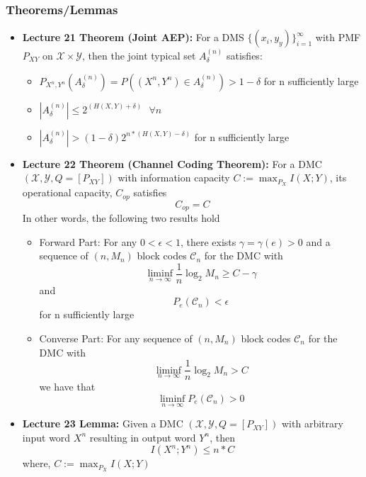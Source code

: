 \documentclass{article}
\begin{document}
\subsubsection{Theorems/Lemmas}
\begin{itemize}
    \item \textbf{Lecture 21 Theorem (Joint AEP):}
    For a DMS \(\{(x_i, y_y)\}_{i=1}^\infty\) with PMF \(P_{XY}\) on \(\mathcal{X} \times \mathcal{Y}\), then the joint typical set \(A^{(n)}_\delta\) satisfies:
    \begin{itemize}
        \item \(P_{X^n,Y^n} (A^{(n)}_\delta) = P((X^n, Y^n) \in A^{(n)}_\delta)> 1 - \delta\) for n sufficiently large
        \item \(|A^{(n)}_\delta| \leq 2^{(H(X,Y) + \delta)} \ \ \ \forall n\)
        \item \(|A^{(n)}_\delta| > (1-\delta) 2^{n*(H(X,Y) - \delta)}\) for n sufficiently large
    \end{itemize}
    \item \textbf{Lecture 22 Theorem (Channel Coding Theorem): }
    For a DMC \((\mathcal{X}, \mathcal{Y}, Q = [P_{XY}])\) with information capacity \(C:= \max_{P_X} I(X;Y)\), its operational capacity, \(C_{op}\) satisfies
    \[C_{op} = C\]
    In other words, the following two results hold
    \begin{itemize}
        \item Forward Part: For any \(0< \epsilon<1\), there exists \(\gamma = \gamma(e)>0\) and a sequence of \((n,M_n)\) block codes \(\mathcal{C}_n\) for the DMC with
        \[\liminf_{n \to \infty} \frac{1}{n} \log_2 M_n \geq C - \gamma\]
        and
        \[P_e(\mathcal{C}_n)< \epsilon\]
        for n sufficiently large
        \item Converse Part: For any sequence of \((n, M_n)\) block codes \(\mathcal{C}_n\) for the DMC with
        \[\liminf_{n \to \infty} \frac{1}{n} \log_2 M_n > C\]
        we have that 
        \[\liminf_{n \to \infty} P_e(\mathcal{C}_n)>0\]
    \end{itemize}
    \item \textbf{Lecture 23 Lemma: } Given a DMC \((\mathcal{X}, \mathcal{Y}, Q = [P_{XY}])\) with arbitrary input word \(X^n\) resulting in output word \(Y^n\), then
    \[I(X^n;Y^n)\leq n * C\]
    where, \(C:= \max_{P_X} I(X;Y)\)


\end{itemize}
\end{document}

